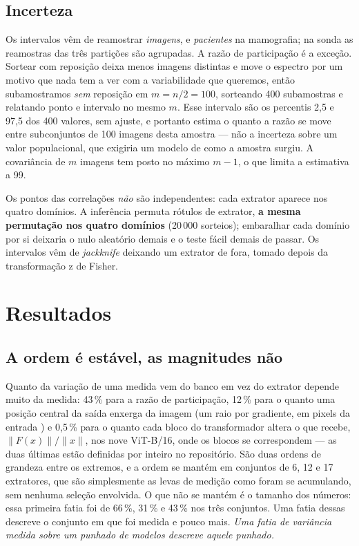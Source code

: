 \documentclass{esannV2}
\begin{document}
\subsection{Incerteza}

Os intervalos vêm de reamostrar \emph{imagens}, e \emph{pacientes} na
mamografia; na sonda as reamostras das três partições são agrupadas. A razão de
participação é a exceção. Sortear com reposição deixa menos imagens distintas e
move o espectro por um motivo que nada tem a ver com a variabilidade que
queremos, então subamostramos \emph{sem} reposição em $m = n/2 = 100$,
sorteando 400 subamostras e relatando ponto e intervalo no mesmo $m$. Esse
intervalo são os percentis 2,5 e 97,5 dos 400 valores, sem ajuste, e portanto
estima o quanto a razão se move entre subconjuntos de 100 imagens desta
amostra --- não a incerteza sobre um valor populacional, que exigiria um
modelo de como a amostra surgiu. A covariância de $m$ imagens tem posto no
máximo $m-1$, o que limita a estimativa a 99.

Os pontos das correlações \emph{não} são independentes: cada extrator aparece
nos quatro domínios. A inferência permuta rótulos de extrator, \textbf{a mesma
permutação nos quatro domínios} (20\,000 sorteios); embaralhar cada domínio por
si deixaria o nulo aleatório demais e o teste fácil demais de passar. Os
intervalos vêm de \emph{jackknife} deixando um extrator de fora, tomado depois
da transformação z de Fisher.

\section{Resultados}

\subsection{A ordem é estável, as magnitudes não}

Quanto da variação de uma medida vem do banco em vez do extrator depende muito
da medida: 43\,\% para a razão de participação, 12\,\% para o quanto uma
posição central da saída enxerga da imagem (um raio por gradiente, em pixels da
entrada \cite{Luo}) e 0,5\,\% para o quanto cada bloco do transformador altera
o que recebe, $\|F(x)\|/\|x\|$, nos nove ViT-B/16, onde os blocos se
correspondem --- as duas últimas estão definidas por inteiro no repositório.
São duas ordens de grandeza entre os extremos, e a ordem se mantém em conjuntos
de 6, 12 e 17 extratores, que são simplesmente as levas de medição como foram
se acumulando, sem nenhuma seleção envolvida. O que não se mantém é o tamanho
dos números: essa primeira fatia foi de 66\,\%, 31\,\% e 43\,\% nos três
conjuntos. Uma fatia dessas descreve o conjunto em que foi medida e pouco mais. \emph{Uma fatia de variância medida sobre
um punhado de modelos descreve aquele punhado.}
\end{document}
